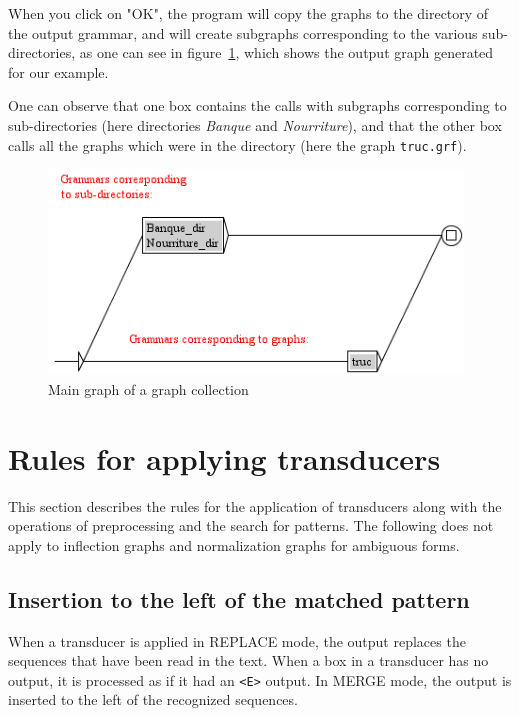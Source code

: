 \bigskip
\noindent When you click on "OK", the program will copy the graphs to the directory of the
output grammar, and will create subgraphs corresponding to the various
sub-directories, as one can see in figure~\ref{fig-graph-collection}, which
shows the output graph generated for our example.

\bigskip
\noindent One can observe that one box contains the calls with subgraphs corresponding to
sub-directories (here directories \textit{Banque} and \textit{Nourriture}), and
that the other box calls  all the graphs which were in the directory (here the
graph \texttt{truc.grf}).

\begin{figure}[!h]
\begin{center}
\includegraphics[width=11cm]{resources/img/fig6-21.png}
\caption{Main graph of a graph collection\label{fig-graph-collection}}
\end{center}
\end{figure}



\section{Rules for applying transducers}
\label{section-applying-transducers-rules}
This section describes the rules for the application of transducers along with
the operations of preprocessing and the search for patterns. The following does
not apply to inflection graphs and normalization graphs for ambiguous forms.

\subsection{Insertion to the left of the matched pattern}
When a transducer is applied in REPLACE mode, the output replaces the sequences
that have been read in the text. When a box in a transducer has no
output, it is processed as if it had an \verb+<E>+ output. In MERGE mode, the
output is inserted to the left of the recognized sequences. 

